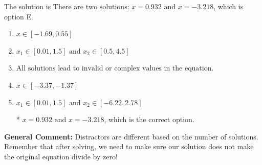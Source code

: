 \documentclass{extbook}[14pt]
\begin{document}
\begin{enumerate}
{The solution is \( \text{There are two solutions: } x = 0.932 \text{ and } x = -3.218 \), which is option E.\begin{enumerate}[label=\Alph*.]
\item \( x \in [-1.69,0.55] \)


\item \( x_1 \in [0.01, 1.5] \text{ and } x_2 \in [0.5,4.5] \)


\item \( \text{All solutions lead to invalid or complex values in the equation.} \)


\item \( x \in [-3.37,-1.37] \)


\item \( x_1 \in [0.01, 1.5] \text{ and } x_2 \in [-6.22,2.78] \)

* $x = 0.932 \text{ and } x = -3.218$, which is the correct option.
\end{enumerate}

\textbf{General Comment:} Distractors are different based on the number of solutions. Remember that after solving, we need to make sure our solution does not make the original equation divide by zero!
}
\end{enumerate}
\end{document}
